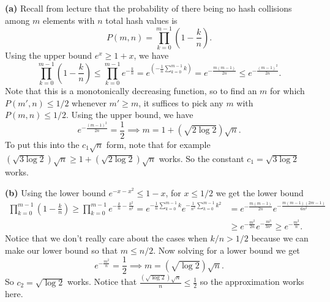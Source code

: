 \documentclass[11pt,letterpaper]{article}
\begin{document}
\begin{solution}
    \textbf{(a)} Recall from lecture that the probability of there being no hash collisions among $m$ elements with $n$ total hash values is
    \[
        P(m,n)=\prod^{m-1}_{k=0}\left(1-\frac{k}{n}\right)
    .\] 
    Using the upper bound $e^x \geq 1+x$, we have
    \[
        \prod^{m-1}_{k=0}\left(1-\frac{k}{n}\right) \leq \prod^{m-1}_{k=0}e^{-\frac{k}{n}}=e^{\left(-\frac{1}{n}\sum^{m-1}_{k=0}k\right)}=e^{-\frac{m(m-1)}{2n}}\leq e^{-\frac{(m-1)^2}{2n}}
    .\]
    Note that this is a monotonically decreasing function, so to find an $m$ for which $P(m',n)\leq 1/2$ whenever $m'\geq m$, it suffices to pick any $m$ with $P(m,n)\leq 1/2$. Using the upper bound, we have
    \[
        e^{-\frac{(m-1)^2}{2n}}=\frac{1}{2}\implies m=1+\left(\sqrt{2\log 2}\right)\sqrt{n} 
    .\] 
    To put this into the $c_1\sqrt{n}$ form, note that for example $\left(\sqrt{3\log 2}\right)\sqrt{n}\geq 1+\left(\sqrt{2\log 2}\right)\sqrt{n}$ works. So the constant $c_1=\sqrt{3\log 2}$ works.
    
    \textbf{(b)} Using the lower bound $e^{-x-x^2}\leq 1-x$, for $x\leq 1/2$ we get the lower bound
    \[
        \begin{aligned}
            \prod^{m-1}_{k=0}\left(1-\frac{k}{n}\right)\geq \prod^{m-1}_{k=0}e^{-\frac{k}{n}-\frac{k^2}{n^2}} = e^{-\frac{1}{n}\sum^{m-1}_{k=0}k}e^{-\frac{1}{n^2}\sum^{m-1}_{k=0}k^2}&=e^{-\frac{m(m-1)}{2n}}e^{-\frac{m(m-1)(2m-1)}{6n^2}}\\&\geq e^{-\frac{m^2}{2n}}e^{-\frac{m^3}{3n^2}}
            \geq e^{-\frac{m^2}{n}}.
        \end{aligned}
    \] 
    Notice that we don't really care about the cases when $k/n > 1 /2$ because we can make our lower bound so that $m\leq n/2$. Now solving for a lower bound we get
    \[
        e^{-\frac{m^2}{n}} = \frac{1}{2} \implies m = \left(\sqrt{\log 2}\right)\sqrt{n}
    .\] 
    So $c_2=\sqrt{\log 2}$ works. Notice that $\frac{\left(\sqrt{\log 2}\right)\sqrt{n}}{n}\leq \frac{1}{2}$ so the approximation works here. 
\end{solution}
\end{document}

